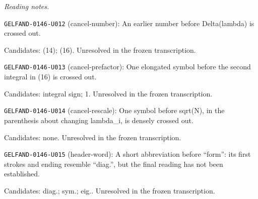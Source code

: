 \par\smallskip\noindent\textit{Reading notes.}\par
\noindent\texttt{GELFAND-0146-U012} (cancel-number): An earlier number before Delta(lambda) is crossed out.\par
Candidates: (14); (16). Unresolved in the frozen transcription.\par
\noindent\texttt{GELFAND-0146-U013} (cancel-prefactor): One elongated symbol before the second integral in (16) is crossed out.\par
Candidates: integral sign; 1. Unresolved in the frozen transcription.\par
\noindent\texttt{GELFAND-0146-U014} (cancel-rescale): One symbol before sqrt(N), in the parenthesis about changing lambda\_i, is densely crossed out.\par
Candidates: none. Unresolved in the frozen transcription.\par
\noindent\texttt{GELFAND-0146-U015} (header-word): A short abbreviation before “form”: its first strokes and ending resemble “diag.”, but the final reading has not been established.\par
Candidates: diag.; sym.; eig.. Unresolved in the frozen transcription.\par


